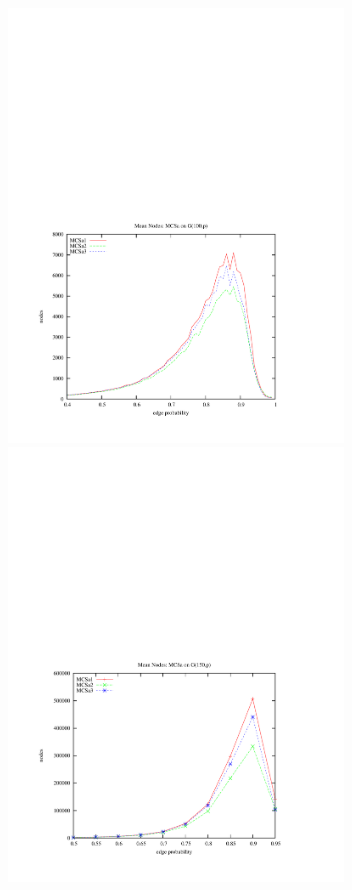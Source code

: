 \documentclass{l4proj}
\begin{document}
\begin{figure}
\begin{center}
\begin{minipage}[t]{0.49\textwidth}
\end{minipage}
\end{center}
\vspace{-6cm}
\begin{center}
\hspace{-1.5cm}
\begin{minipage}[t]{0.49\textwidth}
\includegraphics[height=11.5cm]{mcsa-style-100.pdf}
\end{minipage}
\hfill
\begin{minipage}[t]{0.49\textwidth}
\includegraphics[height=11.5cm]{mcsa-style-150.pdf}

\end{minipage}
\end{center}
\end{figure}
\end{document}
